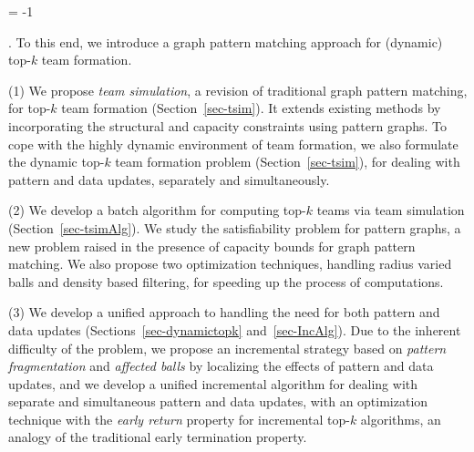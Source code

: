 \looseness = -1

. To this end,  we introduce a graph pattern matching approach for (dynamic) top-$k$ team formation.


\stab (1) We propose {\em team simulation}, a revision of traditional graph pattern matching, for top-$k$ team formation (Section~\ref{sec-tsim}).
It extends existing methods by incorporating the structural and capacity constraints using pattern graphs.
To cope with the highly dynamic environment of team formation, we also formulate the dynamic top-$k$ team formation problem  (Section~\ref{sec-tsim}), for dealing with pattern and data updates, separately and simultaneously.




\stab (2) We develop a batch algorithm for computing top-$k$ teams via team simulation (Section~\ref{sec-tsimAlg}).
We study the satisfiability problem for pattern graphs, a new problem raised in the presence of capacity bounds for graph pattern matching.
We also propose two optimization techniques, handling radius varied balls and density based filtering, for speeding up the process of computations.



\stab (3) We develop a unified approach to handling the need for both pattern and data updates (Sections~\ref{sec-dynamictopk} and~\ref{sec-IncAlg}).
Due to the inherent difficulty of the problem, we propose an incremental strategy based on {\em pattern fragmentation} and {\em affected balls} by localizing the effects of pattern and data updates, and we develop a unified incremental algorithm for dealing with separate and simultaneous pattern and data updates,
with an optimization technique with the {\em early return} property for incremental top-$k$ algorithms, an analogy of the traditional early termination property.


